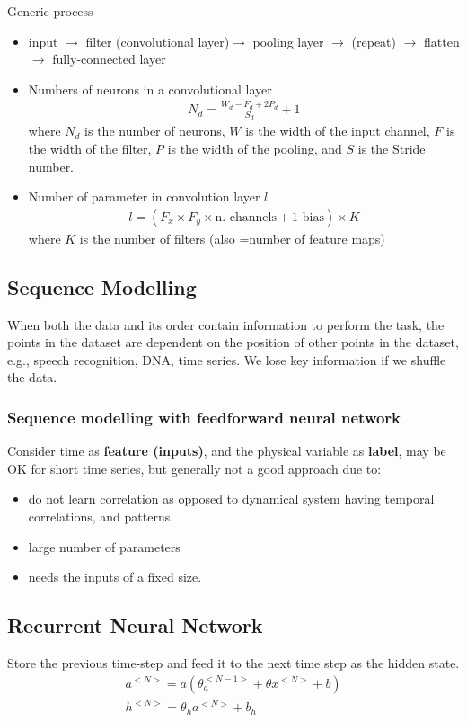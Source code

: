 \documentclass[a4paper,10pt]{article}
\begin{document}
Generic process
\begin{itemize}
    \item input $\rightarrow$ filter (convolutional layer)$\rightarrow$ pooling layer $\rightarrow$ (repeat) $\rightarrow$ flatten $\rightarrow$ fully-connected layer
    \item Numbers of neurons in a convolutional layer
        \begin{gather*}
            N_d = \frac{W_d-F_d+2P_d}{S_d}+1
        \end{gather*}
    where $N_d$ is the number of neurons, $W$ is the width of the input channel, $F$ is the width of the filter, $P$ is the width of the pooling, and $S$ is the Stride number. 
    \item Number of parameter in convolution layer $l$
        \begin{gather*}
            l = (F_x\times F_y\times \text{n. channels} + 1 \text{ bias})\times K
        \end{gather*}
    where $K$ is the number of filters (also =number of feature maps)
\end{itemize}

\subsection{Sequence Modelling}
When both the data and its order contain information to perform the task, the points in the dataset are dependent on the position of other points in the dataset, e.g., speech recognition, DNA, time series. We lose key information if we shuffle the data.

\subsubsection{Sequence modelling with feedforward neural network}
Consider time as \textbf{feature (inputs)}, and the physical variable as \textbf{label}, may be OK for short time series, but generally not a good approach due to:
\begin{itemize}
    \item do not learn correlation as opposed to dynamical system having temporal correlations, and patterns. 
    \item large number of parameters
    \item needs the inputs of a fixed size. 
\end{itemize}

\subsection{Recurrent Neural Network}
Store the previous time-step and feed it to the next time step as the hidden state.
\vspace*{0.3cm}
\begin{gather*}
    a^{<N>} = a(\theta_a^{<N-1>}+\theta x^{<N>}+b)\\
    h^{<N>} = \theta_ha^{<N>}+b_h
\end{gather*}
\end{document}
